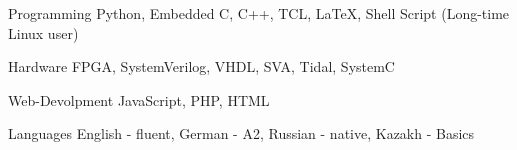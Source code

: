 

\begin{cvskills}

  \cvskill
    {Programming} %
    {Python, Embedded C, C++, TCL, LaTeX, Shell Script (Long-time Linux user)} %

  \cvskill
    {Hardware} %
    {FPGA, SystemVerilog, VHDL, SVA, Tidal, SystemC} %

  \cvskill
    {Web-Devolpment} %
    {JavaScript, PHP, HTML} %

  \cvskill
    {Languages} %
    {English - fluent, German - A2, Russian - native, Kazakh - Basics} %

\end{cvskills}
